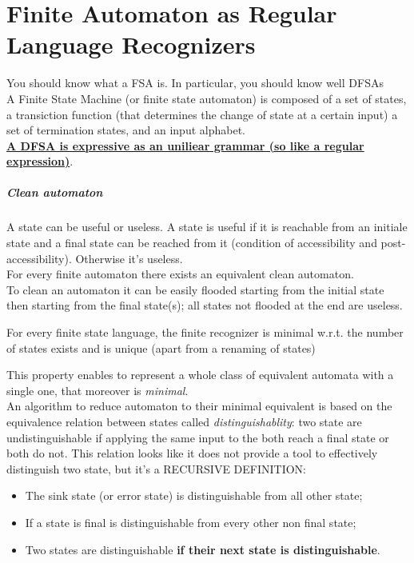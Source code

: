\chapter{Finite Automaton as Regular Language Recognizers}
	You should know what a FSA is. In particular, you should know well DFSAs\\
	A Finite State Machine (or finite state automaton) is composed of a set of states, a transiction function (that determines the change of state at a certain input) a set of termination states, and an input alphabet.\\
	\textbf{\underline{A DFSA is expressive as an uniliear grammar (so like a regular expression)}}.\\
	\paragraph{Clean automaton}
		A state can be useful or useless. A state is useful if it is reachable from an initiale state and a final state can be reached from it (condition of accessibility and post-accessibility). Otherwise it's useless.\\
		For every finite automaton there exists an equivalent clean automaton.\\
		To clean an automaton it can be easily flooded starting from the initial state then starting from the final state(s); all states not flooded at the end are useless.
	\begin{definition}
		For every finite state language, the finite recognizer is minimal w.r.t. the number of states exists and is unique
		 (apart from a renaming of states)
	\end{definition}
		This property enables to represent a whole class of equivalent automata with a single one, that moreover is \emph{minimal}.\\
		An algorithm to reduce automaton to their minimal equivalent is based on the equivalence relation between states called \emph{distinguishablity}: two state are 
		undistinguishable if applying the same input to the both reach a final state or both do not. This relation looks like it does not provide a tool to effectively 
		distinguish two state, but it's a RECURSIVE DEFINITION:
		\begin{itemize}
			\item The sink state (or error state) is distinguishable from all other state;
			\item If a state is final is distinguishable from every other non final state;
			\item Two states are distinguishable \textbf{if their next state is distinguishable}.
		\end{itemize}
	
